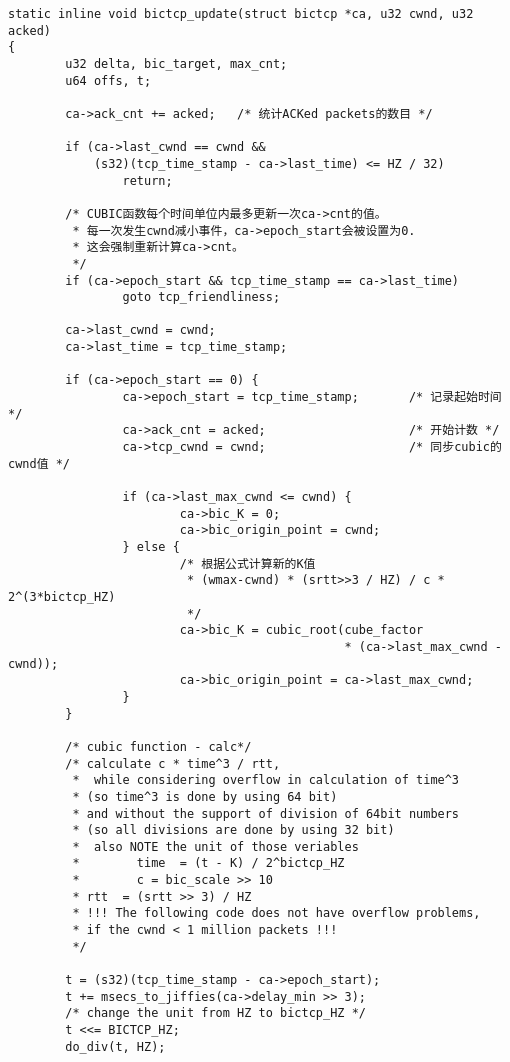 \begin{verbatim}
static inline void bictcp_update(struct bictcp *ca, u32 cwnd, u32 acked)
{
        u32 delta, bic_target, max_cnt;
        u64 offs, t;

        ca->ack_cnt += acked;   /* 统计ACKed packets的数目 */

        if (ca->last_cwnd == cwnd &&
            (s32)(tcp_time_stamp - ca->last_time) <= HZ / 32)
                return;

        /* CUBIC函数每个时间单位内最多更新一次ca->cnt的值。
         * 每一次发生cwnd减小事件，ca->epoch_start会被设置为0.
         * 这会强制重新计算ca->cnt。
         */
        if (ca->epoch_start && tcp_time_stamp == ca->last_time)
                goto tcp_friendliness;

        ca->last_cwnd = cwnd;
        ca->last_time = tcp_time_stamp;

        if (ca->epoch_start == 0) {
                ca->epoch_start = tcp_time_stamp;       /* 记录起始时间 */
                ca->ack_cnt = acked;                    /* 开始计数 */
                ca->tcp_cwnd = cwnd;                    /* 同步cubic的cwnd值 */

                if (ca->last_max_cwnd <= cwnd) {
                        ca->bic_K = 0;
                        ca->bic_origin_point = cwnd;
                } else {
                        /* 根据公式计算新的K值
                         * (wmax-cwnd) * (srtt>>3 / HZ) / c * 2^(3*bictcp_HZ)
                         */
                        ca->bic_K = cubic_root(cube_factor
                                               * (ca->last_max_cwnd - cwnd));
                        ca->bic_origin_point = ca->last_max_cwnd;
                }
        }

        /* cubic function - calc*/
        /* calculate c * time^3 / rtt,
         *  while considering overflow in calculation of time^3
         * (so time^3 is done by using 64 bit)
         * and without the support of division of 64bit numbers
         * (so all divisions are done by using 32 bit)
         *  also NOTE the unit of those veriables
         *        time  = (t - K) / 2^bictcp_HZ
         *        c = bic_scale >> 10
         * rtt  = (srtt >> 3) / HZ
         * !!! The following code does not have overflow problems,
         * if the cwnd < 1 million packets !!!
         */

        t = (s32)(tcp_time_stamp - ca->epoch_start);
        t += msecs_to_jiffies(ca->delay_min >> 3);
        /* change the unit from HZ to bictcp_HZ */
        t <<= BICTCP_HZ;
        do_div(t, HZ);


\end{verbatim}
